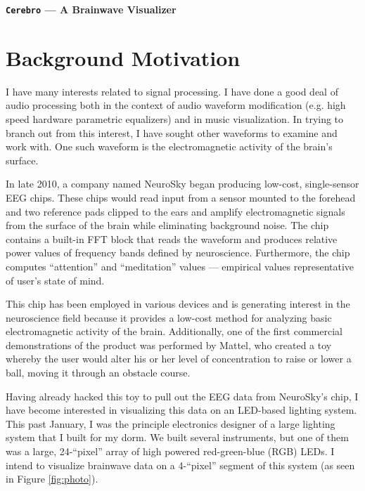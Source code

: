 \documentclass[letterpaper,10pt,notitlepage]{report}
\newcommand{\projname}{\texttt{Cerebro}}
\begin{document}
\begin{center}
	\begin{huge}
		\textbf{\projname{} --- A Brainwave Visualizer}
	\end{huge}
\end{center}

\section{Background Motivation}
    I have many interests related to signal processing.  I have done a good 
    deal of audio processing both in the context of audio waveform 
    modification (e.g. high speed hardware parametric equalizers) and in music 
    visualization.  In trying to branch out from this interest, I have sought 
    other waveforms to examine and work with.  One such waveform is the 
    electromagnetic activity of the brain's surface.

    In late 2010, a company named NeuroSky began producing low-cost,
    single-sensor EEG chips.  These chips would read input from a sensor
    mounted to the forehead and two reference pads clipped to the ears and
    amplify electromagnetic signals from the surface of the brain while
    eliminating background noise.  The chip contains a built-in FFT block that
    reads the waveform and produces relative power values of frequency bands
    defined by neuroscience.  Furthermore, the chip computes ``attention'' and
    ``meditation'' values --- empirical values representative of user's state
    of mind.

    This chip has been employed in various devices and is generating 
    interest in the neuroscience field because it provides a low-cost 
    method for analyzing basic electromagnetic activity of the brain.
    Additionally, one of the first commercial demonstrations of the product was performed by 
    Mattel, who created a toy whereby the user would alter his or her level of 
    concentration to raise or lower a ball, moving it through an obstacle course.

    Having already hacked this toy to pull out the EEG data from 
    NeuroSky's chip, I have become interested in visualizing this data 
    on an LED-based lighting system.  This past January, I was the principle 
    electronics designer of a large lighting system that I built for my dorm.  
    We built several instruments, but one of them was a large,  24-``pixel'' 
    array of high powered red-green-blue (RGB) LEDs.  I intend to visualize 
    brainwave data on a 4-``pixel'' segment of this system (as seen in 
    Figure \ref{fig:photo}).
\end{document}
